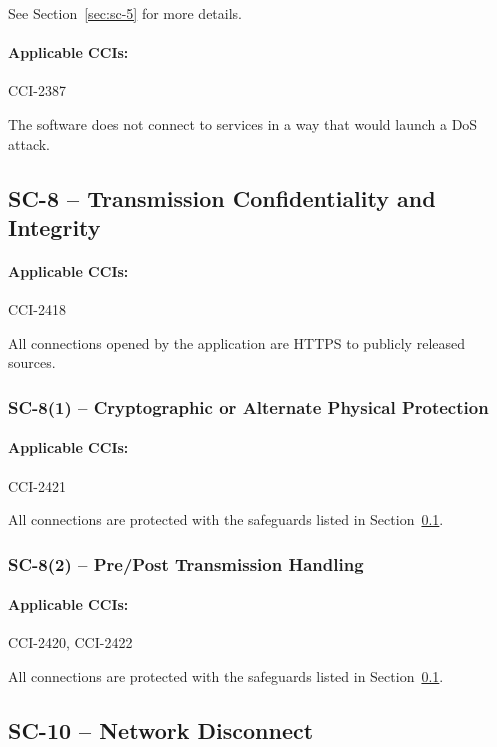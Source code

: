 \documentclass[letterpaper, 10pt, twoside]{article}
\begin{document}
See Section~\ref{sec:sc-5} for more details.

\paragraph{Applicable CCIs:} CCI-2387

The software does not connect to services in a way that would launch a DoS attack.

\subsection{SC-8 -- Transmission Confidentiality and Integrity}
\label{sec:sc-8}

\paragraph{Applicable CCIs:} CCI-2418

All connections opened by the application are HTTPS to publicly released sources.

\subsubsection{SC-8(1) -- Cryptographic or Alternate Physical Protection}

\paragraph{Applicable CCIs:} CCI-2421

All connections are protected with the safeguards listed in Section~\ref{sec:sc-8}.

\subsubsection{SC-8(2) -- Pre/Post Transmission Handling}

\paragraph{Applicable CCIs:} CCI-2420, CCI-2422

All connections are protected with the safeguards listed in Section~\ref{sec:sc-8}.

\subsection{SC-10 -- Network Disconnect}
\end{document}

